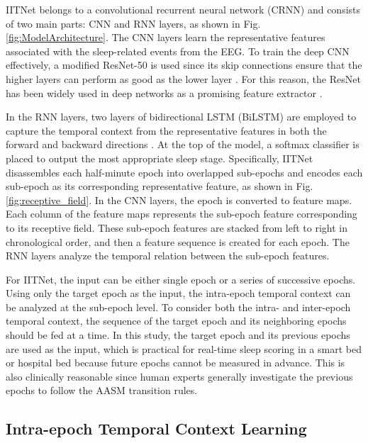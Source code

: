 \documentclass[10pt,twocolumn,twoside]{IEEEtran}
\begin{document}
    IITNet belongs to a convolutional recurrent neural network (CRNN) \cite{shi2017end} and consists of two main parts: CNN and RNN layers, as shown in Fig. \ref{fig:ModelArchitecture}. The CNN layers learn the representative features associated with the sleep-related events from the EEG. To train the deep CNN effectively, a modified ResNet-50 \cite{he2016deep} is used since its skip connections ensure that the higher layers can perform as good as the lower layer \cite{he2016identity}. For this reason, the ResNet has been widely used in deep networks as a promising feature extractor \cite{he2017mask,xie2018rethinking,lu2016hierarchical}.
    
    In the RNN layers, two layers of bidirectional LSTM (BiLSTM) are employed to capture the temporal context from the representative features in both the forward and backward directions \cite{graves2013speech,hochreiter1997long,gers2002learning}. At the top of the model, a softmax classifier is placed to output the most appropriate sleep stage. Specifically, IITNet disassembles each half-minute epoch into  overlapped sub-epochs and encodes each sub-epoch as its corresponding representative feature, as shown in Fig. \ref{fig:receptive_field}. In the CNN layers, the epoch is converted to feature maps. Each column of the feature maps represents the sub-epoch feature corresponding to its receptive field. These  sub-epoch features are stacked from left to right in chronological order, and then a feature sequence is created for each epoch. The RNN layers analyze the temporal relation between the sub-epoch features.
        
    For IITNet, the input can be either single epoch or a series of successive epochs. Using only the target epoch as the input, the intra-epoch temporal context can be analyzed at the sub-epoch level. To consider both the intra- and inter-epoch temporal context, the sequence of the target epoch and its neighboring epochs should be fed at a time. In this study, the target epoch and its previous epochs are used as the input, which is practical for real-time sleep scoring in a smart bed or hospital bed because future epochs cannot be measured in advance. This is also clinically reasonable since human experts generally investigate the previous epochs to follow the AASM transition rules.

    \subsection{Intra-epoch Temporal Context Learning}
    \label{Intra-epoch Temporal Context Learning}
\end{document}
